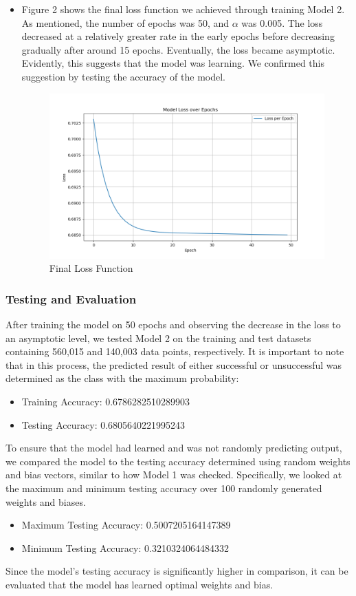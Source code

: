 \documentclass[11pt]{article}
\begin{document}
\begin{enumerate}
\begin{itemize}
    \item Figure 2 shows the final loss function we achieved through training Model 2. As mentioned, the number of epochs was 50, and $\alpha$ was 0.005. The loss decreased at a relatively greater rate in the early epochs before decreasing gradually after around 15 epochs. Eventually, the loss became asymptotic. Evidently, this suggests that the model was learning. We confirmed this suggestion by testing the accuracy of the model. 
         \begin{figure}[H]
        \centering
        \includegraphics[width=0.8\linewidth]{loss_m2final.png}
        \caption{Final Loss Function}
        \end{figure}
\end{itemize}
\subsubsection{Testing and Evaluation}
After training the model on 50 epochs and observing the decrease in the loss to an asymptotic level, we tested Model 2 on the training and test datasets containing 560,015 and 140,003 data points, respectively. It is important to note that in this process, the predicted result of either successful or unsuccessful was determined as the class with the maximum probability:
\begin{itemize}
    \item Training Accuracy: 0.6786282510289903
    \item Testing Accuracy: 0.6805640221995243
\end{itemize}

To ensure that the model had learned and was not randomly predicting output, we compared the model to the testing accuracy determined using random weights and bias vectors, similar to how Model 1 was checked. Specifically, we looked at the maximum and minimum testing accuracy over 100 randomly generated weights and biases.  
\begin{itemize}
    \item Maximum Testing Accuracy: 0.5007205164147389
    \item Minimum Testing Accuracy: 0.3210324064484332
\end{itemize}
Since the model's testing accuracy is significantly higher in comparison, it can be evaluated that the model has learned optimal weights and bias. 


\end{enumerate}
\end{document}
